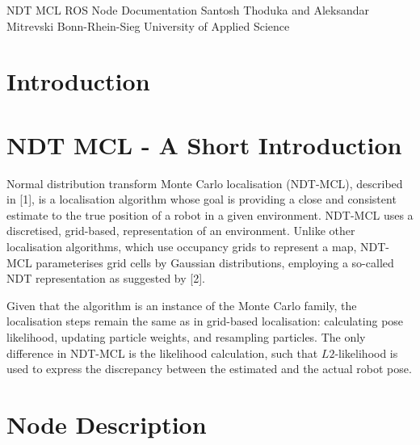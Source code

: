 \documentclass[12pt]{article}
\begin{document}
	\begin{titlepage}
		\vspace*{\fill}
		\begin{center}
			\begin{spacing}{1.5}
				NDT MCL ROS Node Documentation
				\linebreak
				Santosh Thoduka and Aleksandar Mitrevski
				\linebreak
				Bonn-Rhein-Sieg University of Applied Science
			\end{spacing}
		\end{center}
		\vspace*{\fill}
	\end{titlepage}

\setcounter{page}{2}

\newpage
	\setlength{\parindent}{0.0in}

	\tableofcontents

\newpage

	\section{Introduction}
	\label{sec:introduction}

	\section{NDT MCL - A Short Introduction}
	\label{sec:ndtMclIntroduction}

	Normal distribution transform Monte Carlo localisation (NDT-MCL), described in [1], is a localisation algorithm whose goal is providing a close and consistent estimate to the true position of a robot in a given environment. NDT-MCL uses a discretised, grid-based, representation of an environment. Unlike other localisation algorithms, which use occupancy grids to represent a map, NDT-MCL parameterises grid cells by Gaussian distributions, employing a so-called NDT representation as suggested by [2].

	Given that the algorithm is an instance of the Monte Carlo family, the localisation steps remain the same as in grid-based localisation: calculating pose likelihood, updating particle weights, and resampling particles. The only difference in NDT-MCL is the likelihood calculation, such that $L2$-likelihood is used to express the discrepancy between the estimated and the actual robot pose.

	\section{Node Description}
	\label{sec:nodeDescription}
\end{document}
